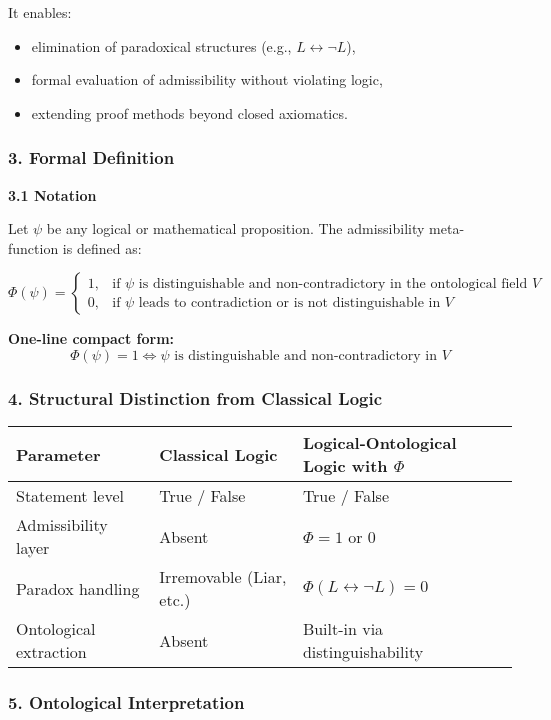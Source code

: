 \documentclass[12pt]{article}
\begin{document}
It enables:
\begin{itemize}
\item elimination of paradoxical structures (e.g., $L \leftrightarrow \neg L$),
\item formal evaluation of admissibility without violating logic,
\item extending proof methods beyond closed axiomatics.
\end{itemize}

\subsubsection*{3. Formal Definition}

\textbf{3.1 Notation}

Let $\psi$ be any logical or mathematical proposition. The admissibility meta-function is defined as:

\[
\Phi(\psi) =
\begin{cases}
1, & \text{if } \psi \text{ is distinguishable and non-contradictory in the ontological field } V \\
0, & \text{if } \psi \text{ leads to contradiction or is not distinguishable in } V
\end{cases}
\]

\textbf{One-line compact form:}
\[
\Phi(\psi) = 1 \iff \psi \text{ is distinguishable and non-contradictory in } V
\]

\subsubsection*{4. Structural Distinction from Classical Logic}

\begin{tabular}{|l|l|l|}
\hline
\textbf{Parameter} & \textbf{Classical Logic} & \textbf{Logical-Ontological Logic with $\Phi$} \\
\hline
Statement level & True / False & True / False \\
Admissibility layer & Absent & $\Phi = 1$ or $0$ \\
Paradox handling & Irremovable (Liar, etc.) & $\Phi(L \leftrightarrow \neg L) = 0$ \\
Ontological extraction & Absent & Built-in via distinguishability \\
\hline
\end{tabular}

\subsubsection*{5. Ontological Interpretation}
\end{document}
